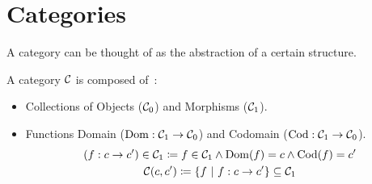 \section{Categories}
A category can be thought of as the abstraction of a certain structure.

\begin{definition}
  A category $\mathcal{C}$ is composed of~\parencite{fong_spivak:7sketches}:
  \begin{itemize}
    \item Collections of Objects ($\mathcal{C}_0$) and Morphisms ($\mathcal{C}_1$).
    \item Functions Domain ($\mathrm{Dom}:\mathcal{C}_1\to \mathcal{C}_0$) and Codomain
      ($\mathrm{Cod}: \mathcal{C}_1 \to \mathcal{C}_0$).
      \[
        \begin{gathered}
          (f : c\to c') \in \mathcal{C}_1
          \coloneqq f\in \mathcal{C}_1
          \land \mathrm{Dom}(f) = c \land \mathrm{Cod}(f) = c'\\
          \mathcal{C}(c, c') \coloneqq \{f\ |\ f : c \to c'\}\subseteq \mathcal{C}_1
        \end{gathered}
      \]
  \end{itemize}


\end{definition}
